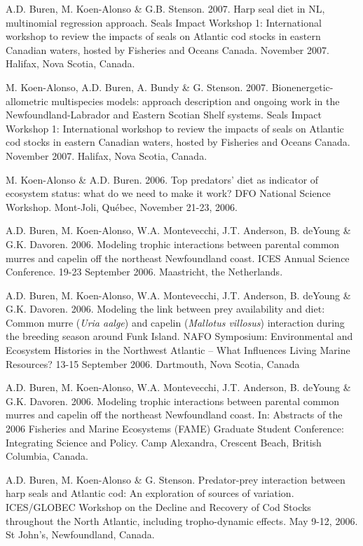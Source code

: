 \documentclass{res}
\begin{document}
\begin{resume}
\begin{hangparas}{.4in}{1}
A.D. Buren, M. Koen-Alonso \& G.B. Stenson. 2007. Harp seal diet in NL, multinomial regression approach. Seals Impact Workshop 1: International workshop to review the impacts of seals on Atlantic cod stocks in eastern Canadian waters, hosted by Fisheries and Oceans Canada. November 2007. Halifax, Nova Scotia, Canada.

M. Koen-Alonso, A.D. Buren, A. Bundy \& G. Stenson. 2007. Bionenergetic-allometric multispecies models: approach description and ongoing work in the Newfoundland-Labrador and Eastern Scotian Shelf systems. Seals Impact Workshop 1: International workshop to review the impacts of seals on Atlantic cod stocks in eastern Canadian waters, hosted by Fisheries and Oceans Canada. November 2007. Halifax, Nova Scotia, Canada.

M. Koen-Alonso \& A.D. Buren. 2006. Top predators' diet as indicator of ecosystem status: what do we need to make it work? DFO National Science Workshop. Mont-Joli, Qu\'{e}bec, November 21-23, 2006.

A.D. Buren, M. Koen-Alonso, W.A. Montevecchi, J.T. Anderson, B. deYoung \& G.K. Davoren. 2006. Modeling trophic interactions between parental common murres and capelin off the northeast Newfoundland coast. ICES Annual Science Conference. 19-23 September 2006. Maastricht, the Netherlands.

A.D. Buren, M. Koen-Alonso, W.A. Montevecchi, J.T. Anderson, B. deYoung \& G.K. Davoren. 2006. Modeling the link between prey availability and diet: Common murre (\textit{Uria aalge}) and capelin (\textit{Mallotus villosus}) interaction during the breeding season around Funk Island. NAFO Symposium: Environmental and Ecosystem Histories in the Northwest Atlantic – What Influences Living Marine Resources? 13-15 September 2006. Dartmouth, Nova Scotia, Canada

A.D. Buren, M. Koen-Alonso, W.A. Montevecchi, J.T. Anderson, B. deYoung \& G.K. Davoren. 2006. Modeling trophic interactions between parental common murres and capelin off the northeast Newfoundland coast. In: Abstracts of the 2006 Fisheries and Marine Ecosystems (FAME) Graduate Student Conference: Integrating Science and Policy. Camp Alexandra, Crescent Beach, British Columbia, Canada.

A.D. Buren, M. Koen-Alonso \& G. Stenson. Predator-prey interaction between harp seals and Atlantic cod: An exploration of sources of variation. ICES/GLOBEC Workshop on the Decline and Recovery of Cod Stocks throughout the North Atlantic, including tropho-dynamic effects. May 9-12, 2006. St John's, Newfoundland, Canada.
 

\end{hangparas}
\end{resume}
\end{document}
